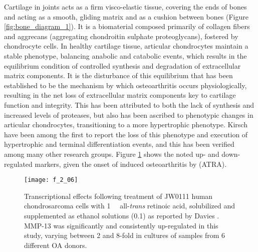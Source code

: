\begin{refsection}
Cartilage in joints acts as a firm visco-elastic tissue, covering the ends of
bones and acting as a smooth, gliding matrix and as a cushion between bones
(Figure \ref{fig:bone_diagram_1}).\cite{Wieland2005} It is a biomaterial composed
primarily of collagen fibers and aggrecans (aggregating chondroitin sulphate
proteoglycans), fostered by chondrocyte cells. In healthy cartilage tissue,
articular chondrocytes maintain a stable phenotype, balancing anabolic and
catabolic events, which results in the equilibrium condition of controlled
synthesis and degradation of extracellular matrix components.\cite{Sandell2001}
It is the disturbance of this equilibrium that has been established to be the
mechanism by which osteoarthritis occurs physiologically, resulting in the net
loss of extracellular matrix components key to cartilage function and integrity.
This has been attributed to both the lack of synthesis and increased levels of
proteases, but also has been ascribed to phenotypic changes in articular
chondrocytes, transitioning to a more hypertrophic
phenotype.\cite{Goldring2000,VanderKraan2012} Kirsch  have
been among the first to report the loss of this phenotype and execution of
hypertrophic and terminal differentiation events,\cite{Kirsch2000} and this has
been verified among many other research
groups.\cite{Tchetina2007,Merz2003,Pfander2001,Davies2009} Figure
\ref{fig:OA_phenotype} shows the noted up- and down-regulated markers, given the
onset of induced osteoarthritis by  (ATRA).

\begin{figure}[h!] \centering \texttt{[image: f\_2\_06]}
    \caption[Transcriptional effects following treatment of JW0111 human
        chondrosarcoma cells with \SI{1}{\micro\moLar} all-\emph{trans} retinoic
        acid, solubilized and supplemented as ethanol solutions
        (\SI{0.1}{\volper}) as reported by Davies . MMP-13 was
    significantly and consistently up-regulated in this study, varying between 2
and 8-fold in cultures of samples from 6 different OA donors.  ]{Transcriptional
    effects following treatment of JW0111 human chondrosarcoma cells with
    \SI{1}{\micro\moLar} all-\emph{trans} retinoic acid, solubilized and
    supplemented as ethanol solutions (\SI{0.1}{\volper}) as reported by Davies
    . MMP-13 was significantly and consistently up-regulated in
    this study, varying between 2 and 8-fold in cultures of samples from 6
    different OA donors.\cite{Davies2009}}
    \label{fig:OA_phenotype} \end{figure}


\end{refsection}
